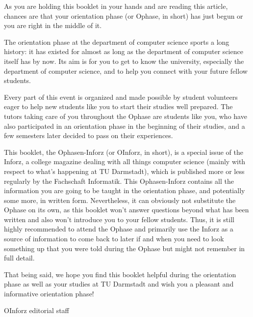 {As you are holding this booklet in your hands and are reading this article, chances are that your orientation phase (or Ophase, in short) has just begun or you are right in the middle of it.}
{
The orientation phase at the department of computer science sports a long history: it has existed for almost as long as the department of computer science itself has by now.
Its aim is for you to get to know the university, especially the department of computer science, and to help you connect with your future fellow students.

Every part of this event is organized and made possible by student volunteers eager to help new students like you to start their studies well prepared.
The tutors taking care of you throughout the Ophase are students like you, who have also participated in an orientation phase in the beginning of their studies, and a few semesters later decided to pass on their experiences.

This booklet, the Ophasen-Inforz (or OInforz, in short), is a special issue of the Inforz, a college magazine dealing with all things computer science (mainly with respect to what's happening at TU Darmstadt), which is published more or less regularly by the Fachschaft Informatik.
This Ophasen-Inforz contains all the information you are going to be taught in the orientation phase, and potentially some more, in written form.
Nevertheless, it can obviously not substitute the Ophase on its own, as this booklet won't answer questions beyond what has been written and also won't introduce you to your fellow students.
Thus, it is still highly recommended to attend the Ophase and primarily use the Inforz as a source of information to come back to later if and when you need to look something up that you were told during the Ophase but might not remember in full detail.

That being said, we hope you find this booklet helpful during the orientation phase as well as your studies at TU Darmstadt and wish you a pleasant and informative orientation phase!
}
{OInforz editorial staff}

